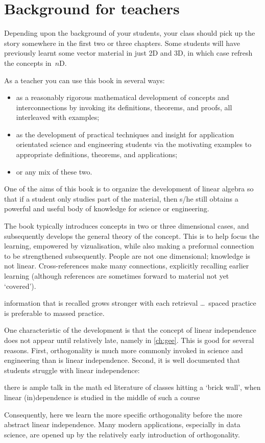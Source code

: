 \section*{Background for teachers}

Depending upon the background of your students, your class should pick up the story somewhere in the first two or three chapters.
Some students will have previously learnt some vector material in just 2D and 3D,  in which case refresh the concepts in~\(n\)D.

As a teacher you can use this book in several ways:
\begin{itemize}
\item as a reasonably rigorous mathematical development of concepts and interconnections by invoking its definitions, theorems, and proofs, all interleaved with examples;
\item as the development of practical techniques and insight for application orientated science and engineering students via the motivating examples to appropriate definitions, theorems, and applications; 
\item or any mix of these two.
\end{itemize}

One of the aims of this book is to organize the development of linear algebra so that if a student only studies part of the material, then s/he still obtains a powerful and useful body of knowledge for science or engineering.

The book typically introduces concepts in two or three dimensional cases, and subsequently develops the general theory of the concept.  
This is to help focus the learning, empowered by vizualisation, while also making a preformal connection to be strengthened subsequently.
People are not one dimensional; knowledge is not linear.
Cross-references make many connections, explicitly recalling earlier learning (although references are sometimes forward to material not yet `covered').
\begin{quoted}{\cite{Halpern2003}}%
information that is recalled grows stronger with each retrieval \ldots\ spaced practice is preferable to massed practice.
\end{quoted}

One characteristic of the development is that the concept of linear independence does not appear until relatively late, namely in \cref{ch:gee}.
This is good for several reasons.
First, orthogonality is much more commonly invoked in science and engineering than is linear independence.
Second, it is well documented that students struggle with linear independence:
\begin{quoted}{\cite{Uhlig02}}
there is ample talk in the math ed literature of classes hitting a `brick wall', when linear (in)dependence is studied in the middle of such a course
\end{quoted}
Consequently, here we learn the more specific orthogonality before the more abstract linear independence.
Many modern applications, especially in data science, are opened up by the relatively early introduction of orthogonality.

